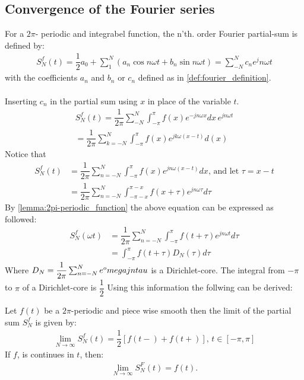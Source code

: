\subsection{Convergence of the Fourier series}
For a $2\pi$- periodic and integrabel function, the n'th. order Fourier partial-sum is defined by: 
\begin{align}\label{eq:partialsumFourierSeries}
	S_N^f(t) = \dfrac{1}{2} a_0 + \sum_1^N\left(a_n \cos n\omega t + b_n \sin n \omega t \right) = \sum_{-N}^N c_n e^jn\omega t
\end{align}
with the coefficients $a_n$ and $b_n$ or $c_n$ defined as in \ref{def:fourier_definition}.\\
\\
Inserting $c_n$ in the partial sum using $x$ in place of the variable $t$.
\begin{align*}
	S_N^f(t)
	= \dfrac{1}{2\pi}\sum_{-N}^N \int_{-\pi}^\pi f(x) e^{-j n \omega x} dx\, e^{jn\omega t}\\
	= \dfrac{1}{2\pi}\sum_{k = -N}^N \int_{-\pi}^\pi f(x) e^{j k \omega (x-t)} d(x)
\end{align*}
Notice that 
\begin{align*}
	S_N^f (t) 
	&= \dfrac{1}{2\pi} \sum_{n=-N}^N \int_{-\pi}^\pi f(x)e^{jn\omega(x-t)} dx\text{, and let } 
	\tau 
	= x-t\\
	&= \dfrac{1}{2\pi} \sum_{n = -N}^N \int_{-\pi - x}^{\pi - x} f(x + \tau ) e^{j n\omega \tau} d\tau
\end{align*}
By \ref{lemma:2pi-periodic_function} the above equation can be expressed as followed:
\begin{align*}
	S_N^f (\omega t) 
	&= \dfrac{1}{2\pi} \sum_{n=-N}^N \int_{-\pi}^\pi f(t + \tau) e^{jn \omega t} d\tau\\
	&= \int_{-\pi}^\pi f(t + \tau) D_N(\tau) d\tau
\end{align*}
Where $D_N = \dfrac{1}{2\pi}\sum_{n=-N}^{N}e^omega{jn\\tau}$ is a Dirichlet-core. 
The integral from $-\pi$ to $\pi$ of a Dirichlet-core is $\dfrac{1}{2}$ 
Using this information the follwing can be derived:
\begin{theorem}
	Let $f(t)$ be a $2\pi$-periodic and piece wise smooth then the limit of the partial sum $S_N^f$ is given by:
	 \begin{align*}
	 	\lim_{N\to\infty} S_N^f (t) = \dfrac{1}{2}\left[f(t-) + f(t+)\right], \, t\in [-\pi, \pi]
	 \end{align*}
	If $f$, is continues in $t$, then:
	\begin{align*}
		\lim_{N\to \infty} S_N^F(t) = f(t).
	\end{align*}
\end{theorem}
